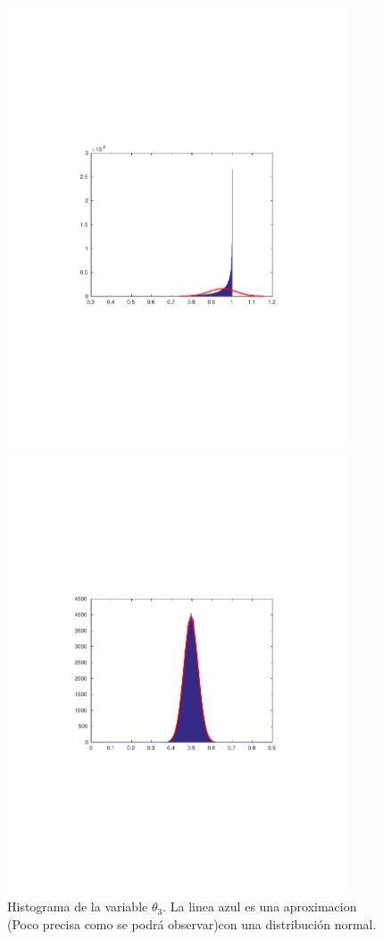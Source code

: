 \begin{figure}[H]
\begin{minipage}{0.5\textwidth}
 \centering
\includegraphics[width=0.9\textwidth]{imgs/theta3.pdf}
	\caption{\footnotesize Histograma de la variable $\theta_3$. La linea azul es una aproximacion (Poco precisa como se podrá observar)con una distribución normal.}
\end{minipage}
\begin{minipage}{0.5\textwidth}
 \centering
\includegraphics[width=0.9\textwidth]{imgs/theta2.pdf}

\end{minipage}
\end{figure}
